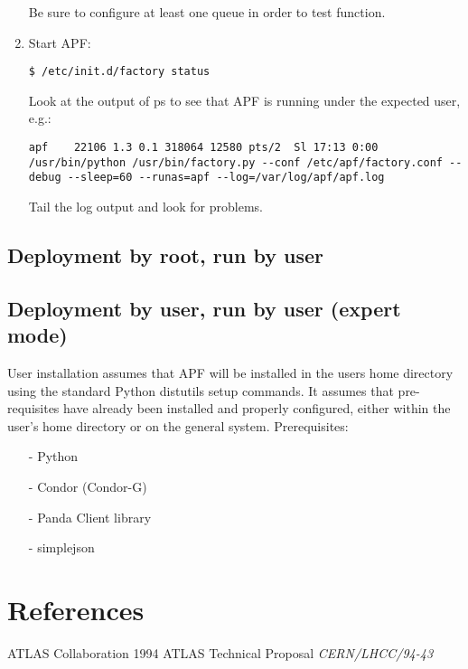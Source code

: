 \documentclass[a4paper]{jpconf}
\begin{document}
\begin{enumerate}
Be sure to configure at least one queue in order to test function.
\item Start APF:
\begin{verbatim}
$ /etc/init.d/factory status
\end{verbatim}
Look at the output of ps to see that APF is running under the expected user, e.g.:
\begin{verbatim}
apf    22106 1.3 0.1 318064 12580 pts/2  Sl 17:13 0:00 /usr/bin/python /usr/bin/factory.py --conf /etc/apf/factory.conf --debug --sleep=60 --runas=apf --log=/var/log/apf/apf.log
\end{verbatim}
Tail the log output and look for problems.
\end{enumerate}

\subsection{Deployment by root, run by user}

\subsection{Deployment by user, run by user (expert mode)}

User installation assumes that APF will be installed in the users home directory using the standard Python distutils setup commands. 
It assumes that pre-requisites have already been installed and properly configured,
either within the user's home directory or on the general system.
Prerequisites: 

\begin{enumerate}
\item[-] Python 
\item[-] Condor (Condor-G) 
\item[-] Panda Client library 
\item[-] simplejson
\end{enumerate}


\section*{References}
\begin{thebibliography}{99}


\item ATLAS Collaboration 1994 ATLAS Technical Proposal 
      {\it CERN/LHCC/94-43} 

\end{thebibliography}
\end{document}
